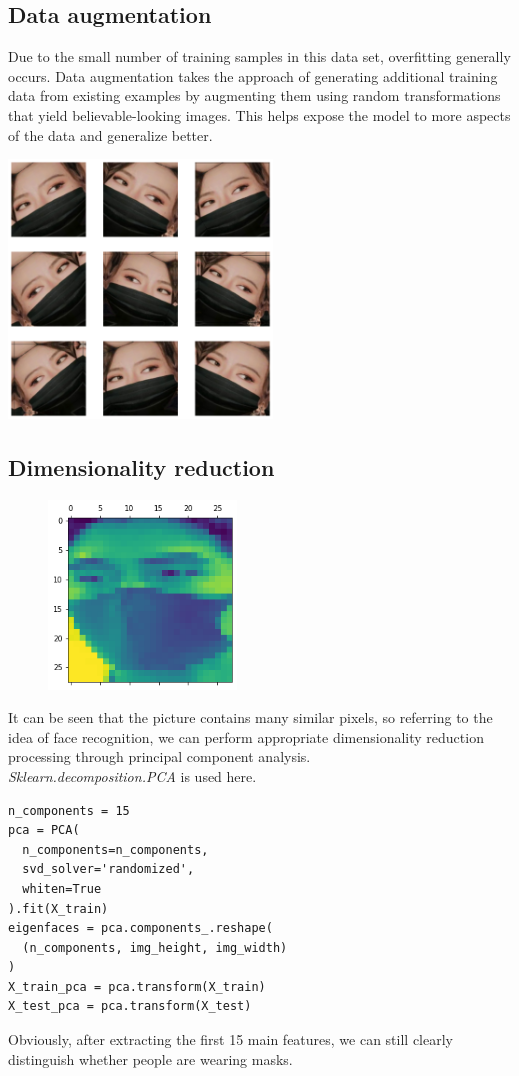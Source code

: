 \documentclass{article}
\begin{document}
\subsection{Data augmentation}
Due to the small number of training samples in this data set, overfitting generally occurs. Data augmentation takes the approach of generating additional training data from existing examples by augmenting them using random transformations that yield believable-looking images. This helps expose the model to more aspects of the data and generalize better.\\
\begin{center}
  \includegraphics[width=7cm]{augmentation.png}
\end{center}


\subsection{Dimensionality reduction}
\begin{figure}
\includegraphics[width=5cm]{pca.png}
\end{figure}
It can be seen that the picture contains many similar pixels, so referring to the idea of face recognition, we can perform appropriate dimensionality reduction processing through principal component analysis.\\
\textit{Sklearn.decomposition.PCA} is used here.
\begin{lstlisting}
n_components = 15
pca = PCA(
  n_components=n_components,
  svd_solver='randomized',
  whiten=True
).fit(X_train)
eigenfaces = pca.components_.reshape(
  (n_components, img_height, img_width)
)
X_train_pca = pca.transform(X_train)
X_test_pca = pca.transform(X_test)
\end{lstlisting}
Obviously, after extracting the first 15 main features, we can still clearly distinguish whether people are wearing masks.
\end{document}
